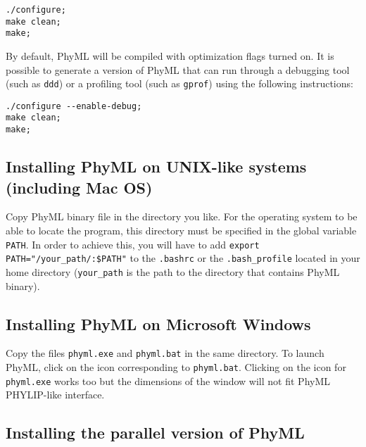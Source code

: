 \documentclass[a4paper,12pt]{article}
\newcommand{\x}[1]{\texttt{#1}}
\begin{document}
{\setlength{\baselineskip}{0.5\baselineskip}
\begin{verbatim}
./configure;
make clean;
make;
\end{verbatim}
}

By default, PhyML will be compiled with optimization flags turned on. It is possible to generate a
version of PhyML that can run through a debugging tool (such as \x{ddd}\label{ddd}) or a profiling
tool (such as \x{gprof}\label{gprof}) using the following instructions:

{\setlength{\baselineskip}{0.5\baselineskip}
\begin{verbatim}
./configure --enable-debug;
make clean;
make;
\end{verbatim}
}




\subsection{Installing PhyML on UNIX-like systems (including Mac OS)}

Copy PhyML binary file in the directory you like.  For the operating system to be able to locate the
program, this directory must be specified in the global variable \x{PATH}. In order to achieve this,
you  will   have  to  add  \x{export   PATH="/your\_path/:\${PATH}"}  to  the   \x{.bashrc}  or  the
\x{.bash\_profile} located in your home directory  (\x{your\_path} is the path to the directory that
contains PhyML binary).


\subsection{Installing PhyML on Microsoft Windows}\label{sec:install_windows}

Copy the files \x{phyml.exe} and \x{phyml.bat} in  the same directory. To launch PhyML, click on the
icon  corresponding to \x{phyml.bat}.   Clicking on  the icon  for \x{phyml.exe}  works too  but the
dimensions of the window will not fit PhyML PHYLIP-like interface.

\subsection{Installing the parallel version of PhyML}\label{sec:MPI}
\end{document}
